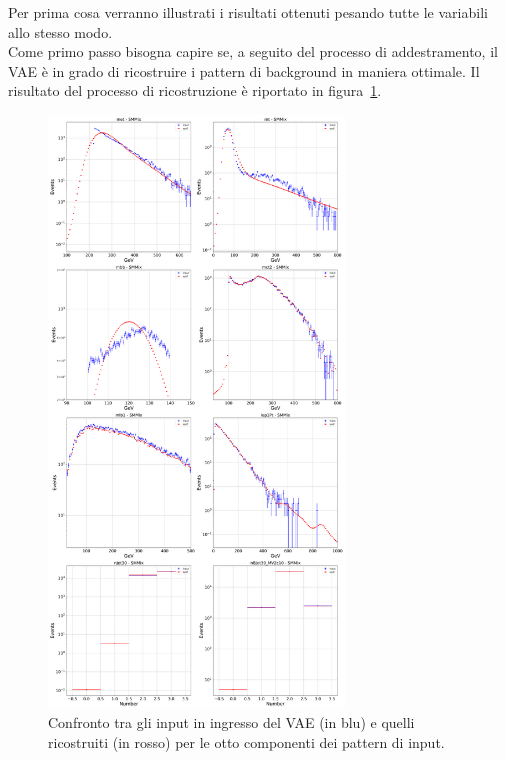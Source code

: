 Per prima cosa verranno illustrati i risultati ottenuti pesando tutte le variabili allo stesso modo. \\
Come primo passo bisogna capire se, a seguito del processo di addestramento, il VAE è in grado di ricostruire i pattern di background in maniera ottimale. Il risultato del processo di ricostruzione è riportato in figura~\ref{ricostruzione}. 

\begin{figure}[h!]
	\centering
	\includegraphics[width=0.70\textwidth]{figs/risultati_simulazione/ricostruzione.png}
	\caption{Confronto tra gli input in ingresso del VAE (in blu) e quelli ricostruiti (in rosso) per le otto componenti dei pattern di input.}
	\label{ricostruzione}
\end{figure}

\newpage

